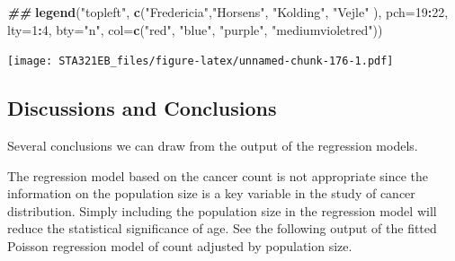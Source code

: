 \documentclass[
]{book}
\newenvironment{Shaded}{\begin{snugshade}}{\end{snugshade}}
\newcommand{\AttributeTok}[1]{\textcolor[rgb]{0.13,0.29,0.53}{#1}}
\newcommand{\DecValTok}[1]{\textcolor[rgb]{0.00,0.00,0.81}{#1}}
\newcommand{\DocumentationTok}[1]{\textcolor[rgb]{0.56,0.35,0.01}{\textbf{\textit{#1}}}}
\newcommand{\FunctionTok}[1]{\textcolor[rgb]{0.13,0.29,0.53}{\textbf{#1}}}
\newcommand{\NormalTok}[1]{#1}
\newcommand{\OtherTok}[1]{\textcolor[rgb]{0.56,0.35,0.01}{#1}}
\newcommand{\SpecialCharTok}[1]{\textcolor[rgb]{0.81,0.36,0.00}{\textbf{#1}}}
\newcommand{\StringTok}[1]{\textcolor[rgb]{0.31,0.60,0.02}{#1}}
\begin{document}
\begin{Shaded}
\begin{Highlighting}[]
\DocumentationTok{\#\#}
\FunctionTok{legend}\NormalTok{(}\StringTok{"topleft"}\NormalTok{, }\FunctionTok{c}\NormalTok{(}\StringTok{"Fredericia"}\NormalTok{,}\StringTok{"Horsens"}\NormalTok{, }\StringTok{"Kolding"}\NormalTok{, }\StringTok{"Vejle"}\NormalTok{ ),}
                  \AttributeTok{pch=}\DecValTok{19}\SpecialCharTok{:}\DecValTok{22}\NormalTok{, }\AttributeTok{lty=}\DecValTok{1}\SpecialCharTok{:}\DecValTok{4}\NormalTok{,  }\AttributeTok{bty=}\StringTok{"n"}\NormalTok{, }
        \AttributeTok{col=}\FunctionTok{c}\NormalTok{(}\StringTok{"red"}\NormalTok{, }\StringTok{"blue"}\NormalTok{, }\StringTok{"purple"}\NormalTok{, }\StringTok{"mediumvioletred"}\NormalTok{))}
\end{Highlighting}
\end{Shaded}

\texttt{[image: STA321EB\_files/figure-latex/unnamed-chunk-176-1.pdf]}

\hypertarget{discussions-and-conclusions-1}{%
\subsection{Discussions and Conclusions}\label{discussions-and-conclusions-1}}

Several conclusions we can draw from the output of the regression models.

The regression model based on the cancer count is not appropriate since the information on the population size is a key variable in the study of cancer distribution. Simply including the population size in the regression model will reduce the statistical significance of age. See the following output of the fitted Poisson regression model of count adjusted by population size.

\begin{Shaded}
\end{Shaded}
\end{document}
